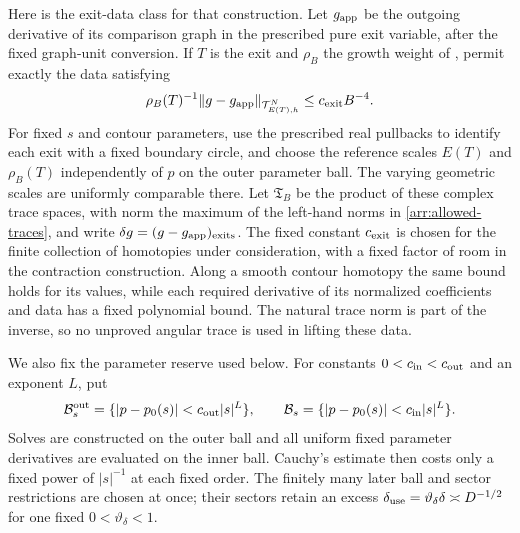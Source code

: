 Here is the exit-data class for that construction.  Let $g_{\rm app}$
be the outgoing derivative of its comparison graph in the prescribed
pure exit variable, after the fixed graph-unit conversion.  If $T$ is
the exit and $\rho_B$ the growth weight of , permit
exactly the data satisfying
\begin{equation}\label{arr:allowed-traces}
 \rho_B(T)^{-1}
 \|g-g_{\rm app}\|_{\mathcal T^N_{E(T),h}}
       \le c_{\rm exit}B^{-4}.
\end{equation}
For fixed $s$ and contour parameters, use the prescribed real pullbacks
to identify each exit with a fixed boundary circle, and choose the
reference scales $E(T)$ and $\rho_B(T)$ independently of $p$ on the
outer parameter ball.  The varying geometric scales are uniformly
comparable there.  Let $\mathfrak T_B$ be the product of these complex
trace spaces, with norm the maximum of the left-hand norms in
\eqref{arr:allowed-traces}, and write
$\delta g=(g-g_{\rm app})_{\rm exits}$.  The fixed constant
$c_{\rm exit}$ is chosen for the finite collection of homotopies under
consideration, with a fixed factor of room in the contraction
construction.  Along a smooth contour homotopy the same bound holds
for its values, while each required derivative of its normalized
coefficients and data has a fixed polynomial bound.  The natural trace
norm is part of the inverse, so no unproved angular trace is used in
lifting these data.

We also fix the parameter reserve used below.  For constants
$0<c_{\rm in}<c_{\rm out}$ and an exponent $L$, put
\begin{equation}\label{arr:parameter-reserve}
 \mathcal B_s^{\rm out}=\{|p-p_0(s)|<c_{\rm out}|s|^L\},
 \qquad
 \mathcal B_s=\{|p-p_0(s)|<c_{\rm in}|s|^L\}.
\end{equation}
Solves are constructed on the outer ball and all uniform fixed
parameter derivatives are evaluated on the inner ball.  Cauchy's
estimate then costs only a fixed power of $|s|^{-1}$ at each fixed
order.  The finitely many later ball and sector restrictions are chosen
at once; their sectors retain an excess
$\delta_{\rm use}=\vartheta_\delta\delta\asymp D^{-1/2}$ for one fixed
$0<\vartheta_\delta<1$.

